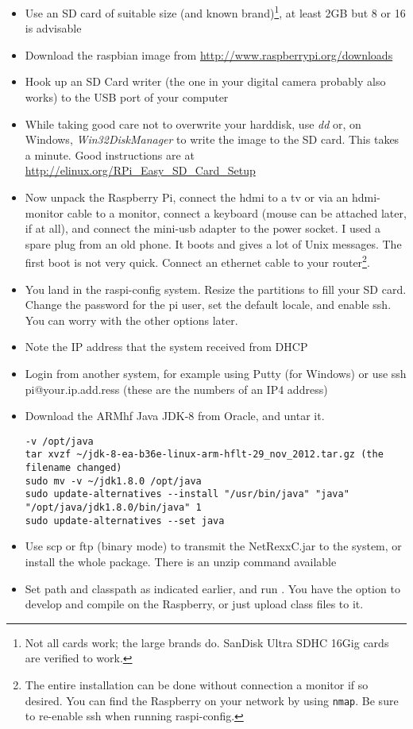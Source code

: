 \begin{itemize}
\item Use an SD card of suitable size (and known brand)\footnote{Not all cards work; the large brands do. SanDisk Ultra SDHC 16Gig cards are verified to work.}, at least 2GB but 8 or 16 is advisable
\item Download the raspbian image from \url{http://www.raspberrypi.org/downloads}
\item Hook up an SD Card writer (the one in your digital camera probably also works) to the USB port of your computer
\item While taking good care not to overwrite your harddisk, use \emph{dd} or, on Windows, \emph{Win32DiskManager} to write the image to the SD card. This takes a minute. Good instructions are at \url{http://elinux.org/RPi_Easy_SD_Card_Setup}
\item Now unpack the Raspberry Pi, connect the hdmi to a tv or via an hdmi-monitor cable to a monitor, connect a keyboard (mouse can be attached later, if at all), and connect the mini-usb adapter to the power socket. I used a spare plug from an old phone. It boots and gives a lot of Unix messages. The first boot is not very quick. Connect an ethernet cable to your router\footnote{The entire installation can be done without connection a monitor if so desired. You can find the Raspberry on your network by using \texttt{nmap}. Be sure to re-enable ssh when running raspi-config.}.
\item You land in the raspi-config system. Resize the partitions to fill your SD card. Change the password for the pi user, set the default locale, and enable ssh. You can worry with the other options later.
\item Note the IP address that the system received from DHCP
\item Login from another system, for example using Putty (for Windows) or use ssh pi@your.ip.add.ress (these are the numbers of an IP4 address)
\item Download the ARMhf Java JDK-8 from Oracle, and untar it.
\begin{verbatim}
-v /opt/java 
tar xvzf ~/jdk-8-ea-b36e-linux-arm-hflt-29_nov_2012.tar.gz (the filename changed) 
sudo mv -v ~/jdk1.8.0 /opt/java 
sudo update-alternatives --install "/usr/bin/java" "java" "/opt/java/jdk1.8.0/bin/java" 1 
sudo update-alternatives --set java 
\end{verbatim}
\item Use scp or ftp (binary mode) to transmit the NetRexxC.jar to the system, or install the whole \nr{} package. There is an unzip command available
\item Set path and classpath as indicated earlier, and run \nr{}. You have the option to develop and compile on the Raspberry, or just upload class files to it.
\end{itemize}